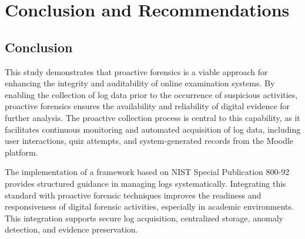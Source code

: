 \chapter{Conclusion and Recommendations}

\section{Conclusion}

This study demonstrates that proactive forensics is a viable approach for enhancing the integrity and auditability of online examination systems. By enabling the collection of log data prior to the occurrence of suspicious activities, proactive forensics ensures the availability and reliability of digital evidence for further analysis. The proactive collection process is central to this capability, as it facilitates continuous monitoring and automated acquisition of log data, including user interactions, quiz attempts, and system-generated records from the Moodle platform.

The implementation of a framework based on NIST Special Publication 800-92 provides structured guidance in managing logs systematically. Integrating this standard with proactive forensic techniques improves the readiness and responsiveness of digital forensic activities, especially in academic environments. This integration supports secure log acquisition, centralized storage, anomaly detection, and evidence preservation.

